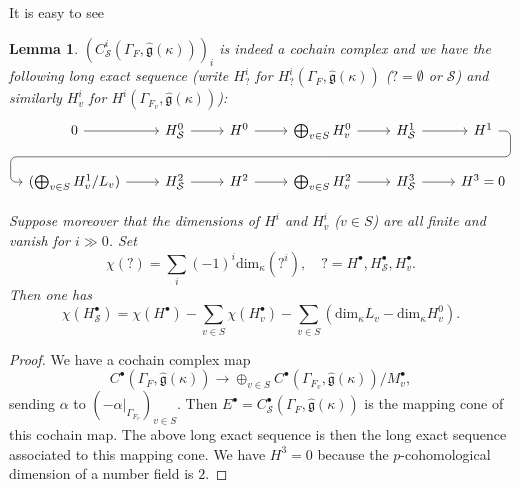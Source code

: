 \documentclass[12pt,oneside,reqno]{amsart}
\theoremstyle{plain}
\newtheorem{lemma}[theorem]{Lemma}
\begin{document}
	
	
	
	
	
	
	
	
	
	
	
	It is easy to see
	\begin{lemma}\label{long exact sequence}
		$(C^i_{\mathcal{S}}(\Gamma_F,
		\widehat{\mathfrak{g}}(\kappa)))_i$
		is indeed a cochain complex and
		we have the following long exact sequence
		(write
		$H^i_?$
		for
		$H^i_?(\Gamma_F,
		\widehat{\mathfrak{g}}(\kappa))$
		($?=\emptyset$ or $\mathcal{S}$) and
		similarly
		$H^i_v$ for
		$H^i(\Gamma_{F_v},
		\widehat{\mathfrak{g}}(\kappa))$):
		\begin{equation}\label{long exact sequence for cohomology groups}
			\begin{tikzcd}
				0
				\arrow[r]
				&
				H^0_{\mathcal{S}}
				\arrow[r]
				&
				H^0
				\arrow[r]
				&
				\bigoplus_{v\in S}
				H^0_v
				\arrow[r]
				\arrow[d, phantom, ""{coordinate, name=Z}]
				&
				H^1_{\mathcal{S}}
				\arrow[r]
				&
				H^1
				\arrow[llllld, rounded corners, to path={ -- ([xshift=2ex]\tikztostart.east) |- (Z) [near end]\tikztonodes			
					-| ([xshift=-2ex]\tikztotarget.west)			
					-- (\tikztotarget)}]
				\\
				(\bigoplus_{v\in S}
				H^1_v/L_v)
				\arrow[r]
				&
				H^2_{\mathcal{S}}
				\arrow[r]
				&
				H^2
				\arrow[r]
				&
				\bigoplus_{v\in S}H^2_v
				\arrow[r]
				&
				H_{\mathcal{S}}^3
				\arrow[r]
				&
				H^3=0
			\end{tikzcd}
		\end{equation}
		
		
		
		
		Suppose moreover that the dimensions of
		$H^i$ and
		$H^i_v$
		($v\in S$)
		are all finite and vanish for $i\gg0$.
		Set
		\begin{equation}\label{Euler characteristic}
			\chi(?)
			=\sum_i(-1)^i\mathrm{dim}_\kappa
			(?^i),
			\quad
			?=H^\bullet,H^\bullet_{\mathcal{S}},H_v^\bullet.
		\end{equation}
		Then one has
		\[
		\chi(H^\bullet_{\mathcal{S}})
		=
		\chi(H^\bullet)
		-
		\sum_{v\in S}
		\chi(H_v^\bullet)
		-
		\sum_{v\in S}
		(
		\mathrm{dim}_\kappa
		L_v
		-
		\mathrm{dim}_\kappa
		H^0_v).
		\]
		
		
	\end{lemma}
	\begin{proof}
		We have a cochain complex map
		\[
		C^\bullet
		(\Gamma_F,
		\widehat{\mathfrak{g}}(\kappa))
		\rightarrow
		\oplus_{v\in S}
		C^\bullet
		(\Gamma_{F_v},
		\widehat{\mathfrak{g}}(\kappa))
		/M^\bullet_v,
		\]
		sending
		$\alpha$ to
		$(-\alpha|_{\Gamma_{F_v}})_{v\in S}$.
		Then
		$E^\bullet=C^\bullet_{\mathcal{S}}
		(\Gamma_F,
		\widehat{\mathfrak{g}}(\kappa))$
		is the mapping cone of this cochain map.
		The above long exact sequence
		is then the long exact sequence associated to
		this mapping cone.
		We have $H^3=0$
		because the $p$-cohomological dimension of
		a number field is $2$.
	\end{proof}
	
\end{document}
